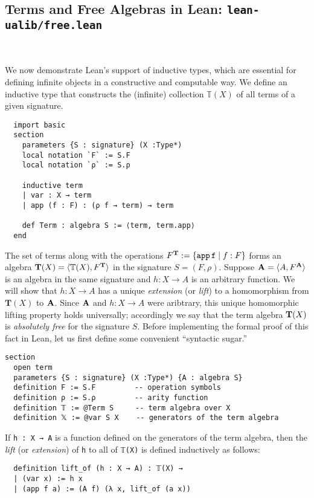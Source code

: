\documentclass[12pt]{amsart}  %
\begin{document}
\subsection{Terms and Free Algebras in Lean: \lstinline{lean-ualib/free.lean}}\

\noindent We now demonstrate Lean's support of inductive types, which are 
essential for defining infinite objects in a constructive and computable way. 
We define an inductive type that constructs the (infinite) 
collection $\mathbb T (X)$ of all terms of a given signature.
\begin{lstlisting}
  import basic
  section
    parameters {S : signature} (X :Type*) 
    local notation `F` := S.F
    local notation `ρ` := S.ρ 
  
    inductive term
    | var : X → term
    | app (f : F) : (ρ f → term) → term

    def Term : algebra S := ⟨term, term.app⟩
  end
\end{lstlisting}
The set of terms along with the operations $F^{\mathbf{T}} := \{\mathtt{app \,f} \mid f : F\}$ forms an algebra $\mathbf{T}(X) = \langle \mathbb T(X), F^{\mathbf{T}}\rangle$ in the signature $S = (F, \rho)$. Suppose $\mathbf{A} = \langle A, F^{\mathbf{A}}\rangle$ is an algebra in the same signature and $h \colon X \to A$ is an arbitrary function.  We will show that $h \colon X \to A$ has a unique \emph{extension} (or \emph{lift}) to a homomorphism from $\mathbf T(X)$ to $\mathbf{A}$.  Since $\mathbf{A}$ and $h \colon X \to A$ were aribtrary, this unique homomorphic lifting property holds universally; accordingly we say that the term algebra $\mathbf{T}(X)$ is \emph{absolutely free} for the signature $S$.
Before implementing the formal proof of this fact in Lean, let us first define some convenient ``syntactic sugar.''
\begin{lstlisting}
section
  open term
  parameters {S : signature} (X :Type*) {A : algebra S}
  definition F := S.F         -- operation symbols
  definition ρ := S.ρ         -- arity function
  definition 𝕋 := @Term S     -- term algebra over X
  definition 𝕏 := @var S X    -- generators of the term algebra
\end{lstlisting}
If \lstinline{h : X → A} is a function defined on the generators
of the term algebra, then the \emph{lift} (or \emph{extension}) of  \lstinline{h} 
to all of \lstinline{𝕋(X)} is defined inductively as follows:
\begin{lstlisting}
  definition lift_of (h : X → A) : 𝕋(X) → 
  | (var x) := h x
  | (app f a) := (A f) (λ x, lift_of (a x))
\end{lstlisting}
\end{document}
